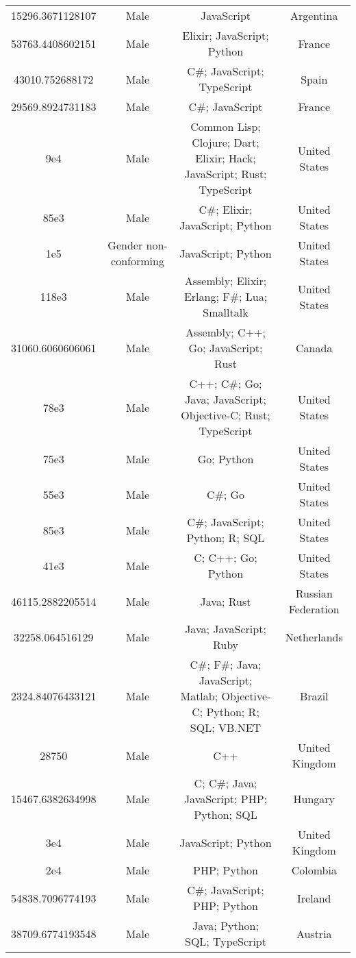 \begin{center}
\begin{tabular}{ |c|c|c|c| }
15296.3671128107  &  Male  &  JavaScript  &  Argentina  \\ 
53763.4408602151  &  Male  &  Elixir; JavaScript; Python  &  France  \\ 
43010.752688172  &  Male  &  C\#; JavaScript; TypeScript  &  Spain  \\ 
29569.8924731183  &  Male  &  C\#; JavaScript  &  France  \\ 
9e4  &  Male  &  Common Lisp; Clojure; Dart; Elixir; Hack; JavaScript; Rust; TypeScript  &  United States  \\ 
85e3  &  Male  &  C\#; Elixir; JavaScript; Python  &  United States  \\ 
1e5  &  Gender non-conforming  &  JavaScript; Python  &  United States  \\ 
118e3  &  Male  &  Assembly; Elixir; Erlang; F\#; Lua; Smalltalk  &  United States  \\ 
31060.6060606061  &  Male  &  Assembly; C++; Go; JavaScript; Rust  &  Canada  \\ 
78e3  &  Male  &  C++; C\#; Go; Java; JavaScript; Objective-C; Rust; TypeScript  &  United States  \\ 
75e3  &  Male  &  Go; Python  &  United States  \\ 
55e3  &  Male  &  C\#; Go  &  United States  \\ 
85e3  &  Male  &  C\#; JavaScript; Python; R; SQL  &  United States  \\ 
41e3  &  Male  &  C; C++; Go; Python  &  United States  \\ 
46115.2882205514  &  Male  &  Java; Rust  &  Russian Federation  \\ 
32258.064516129  &  Male  &  Java; JavaScript; Ruby  &  Netherlands  \\ 
2324.84076433121  &  Male  &  C\#; F\#; Java; JavaScript; Matlab; Objective-C; Python; R; SQL; VB.NET  &  Brazil  \\ 
28750  &  Male  &  C++  &  United Kingdom  \\ 
15467.6382634998  &  Male  &  C; C\#; Java; JavaScript; PHP; Python; SQL  &  Hungary  \\ 
3e4  &  Male  &  JavaScript; Python  &  United Kingdom  \\ 
2e4  &  Male  &  PHP; Python  &  Colombia  \\ 
54838.7096774193  &  Male  &  C\#; JavaScript; PHP; Python  &  Ireland  \\ 
38709.6774193548  &  Male  &  Java; Python; SQL; TypeScript  &  Austria  \\ 

\end{tabular}
\end{center}
